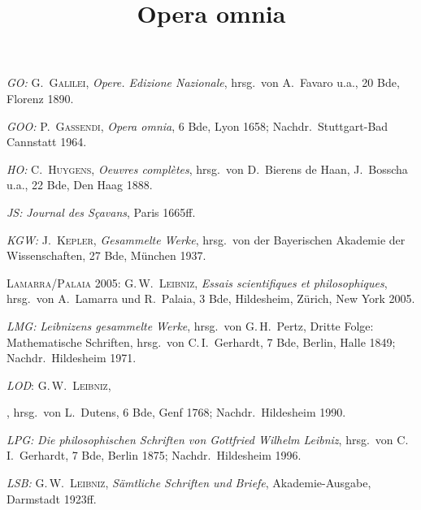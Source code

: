 %
\noindent\hangindent=10mm\textit{GO:} G.\ \textsc{Galilei}, \textit{Opere. Edizione Nazionale}, hrsg.\ von A.~Favaro u.a., 20 Bde, Florenz 1890.\par
%
\noindent\hangindent=10mm\textit{GOO:} P.\ \textsc{Gassendi}, \textit{Opera omnia}, 6 Bde, Lyon 1658; Nachdr.\ Stuttgart-Bad Cannstatt 1964.\par
%
\noindent\hangindent=10mm\textit{HO:} C.\ \textsc{Huygens}, \textit{Oeuvres compl\`{e}tes}, hrsg.\ von D.~Bierens de Haan, J.~Bosscha u.a., 22 Bde, Den Haag 1888.\par
%
\noindent\hangindent=10mm\textit{JS:} \textit{Journal des S\c{c}avans}, Paris 1665ff.\par
%
\noindent\hangindent=10mm\textit{KGW:} J.\ \textsc{Kepler}, \textit{Gesammelte Werke}, hrsg.\ von der Bayerischen Akademie der Wissenschaften, 27 Bde, München %
1937.\par
%
%
\noindent\hangindent=10mm\textsc{Lamarra/Palaia} 2005: G.\,W.\ \textsc{Leibniz}, \textit{Essais scientifiques et philosophiques}, hrsg.\ von A.~Lamarra und R.~Palaia, 3 Bde, Hildesheim, Zürich, New York 2005.\par
%
\noindent\hangindent=10mm\textit{LMG:} \textit{Leibnizens gesammelte Werke}, hrsg.\ von G.\,H.~Pertz, Dritte Folge: Mathematische Schriften, hrsg.\ von C.\,I.~Gerhardt, 7 Bde, Berlin, Halle 1849; Nachdr.\ Hildesheim 1971.\par
%
\noindent\hangindent=10mm\textit{LOD}: G.\,W.\ \textsc{Leibniz}, \title{Opera omnia}, hrsg.\ von L.~Dutens, 6 Bde, Genf 1768; Nachdr.\ Hildesheim 1990.\par
%
\noindent\hangindent=10mm\textit{LPG:} \textit{Die philosophischen Schriften von Gottfried Wilhelm Leibniz}, hrsg.\ von C.\,I.~Gerhardt, 7 Bde, Berlin 1875; Nachdr.\ Hildesheim 1996.\par
%
\noindent\hangindent=10mm\textit{LSB:} G.\,W.\ \textsc{Leibniz}, \textit{Sämtliche Schriften und Briefe}, Akademie-Ausgabe, Darmstadt 1923ff.\
